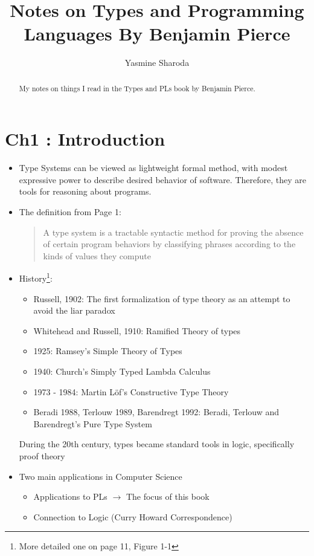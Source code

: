 \documentclass[]{article}
\title{Notes on Types and Programming Languages By Benjamin Pierce}
\author{Yasmine Sharoda}
\begin{document}
\maketitle

\begin{abstract}
My notes on things I read in the Types and PLs book by Benjamin Pierce. 
\end{abstract}

\section{Ch1 : Introduction}
\begin{itemize}
\item Type Systems can be viewed as lightweight formal method, with modest expressive power to describe desired behavior of software. Therefore, they are tools for reasoning about programs.  
\item The definition from Page 1:
\begin{quotation}
	A type system is a tractable syntactic method for proving the absence of certain program behaviors by classifying phrases according to the kinds of values they compute
\end{quotation}
\item History\footnote{More detailed one on page 11, Figure 1-1}: 
  \begin{itemize}
  	\item Russell, 1902: The first formalization of type theory as an attempt to avoid the liar paradox 
  	\item Whitehead and Russell, 1910: Ramified Theory of types 
  	\item 1925: Ramsey's Simple Theory of Types 
  	\item 1940: Church's Simply Typed Lambda Calculus 
  	\item 1973 - 1984: Martin L\"of's Constructive Type Theory 
  	\item Beradi 1988, Terlouw 1989, Barendregt 1992: Beradi, Terlouw and Barendregt's Pure Type System 
  \end{itemize}
During the 20th century, types became standard tools in logic, specifically proof theory 
\item Two main applications in Computer Science 
	\begin{itemize}
		\item Applications to PLs $\rightarrow$ The focus of this book 
		\item Connection to Logic (Curry Howard Correspondence)

\end{itemize}
\end{itemize}
\end{document}
